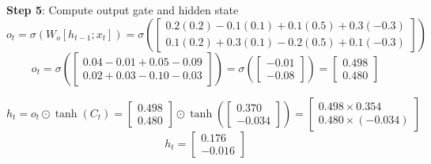 \documentclass[11pt,a4paper]{article}
\begin{document}
\begin{tcolorbox}[colback=green!5!white,colframe=green!75!black,title=\textbf{Worked Example 22: LSTM Gate Computations}]
\textbf{Step 5}: Compute output gate and hidden state
\[
o_t = \sigma(W_o [h_{t-1}; x_t]) = \sigma\left(\begin{bmatrix} 0.2(0.2) - 0.1(0.1) + 0.1(0.5) + 0.3(-0.3) \\ 0.1(0.2) + 0.3(0.1) - 0.2(0.5) + 0.1(-0.3) \end{bmatrix}\right)
\]
\[
o_t = \sigma\left(\begin{bmatrix} 0.04 - 0.01 + 0.05 - 0.09 \\ 0.02 + 0.03 - 0.10 - 0.03 \end{bmatrix}\right) = \sigma\left(\begin{bmatrix} -0.01 \\ -0.08 \end{bmatrix}\right) = \begin{bmatrix} 0.498 \\ 0.480 \end{bmatrix}
\]

\[
h_t = o_t \odot \tanh(C_t) = \begin{bmatrix} 0.498 \\ 0.480 \end{bmatrix} \odot \tanh\left(\begin{bmatrix} 0.370 \\ -0.034 \end{bmatrix}\right) = \begin{bmatrix} 0.498 \times 0.354 \\ 0.480 \times (-0.034) \end{bmatrix}
\]
\[
h_t = \begin{bmatrix} 0.176 \\ -0.016 \end{bmatrix}
\]
\end{tcolorbox}
\end{document}
